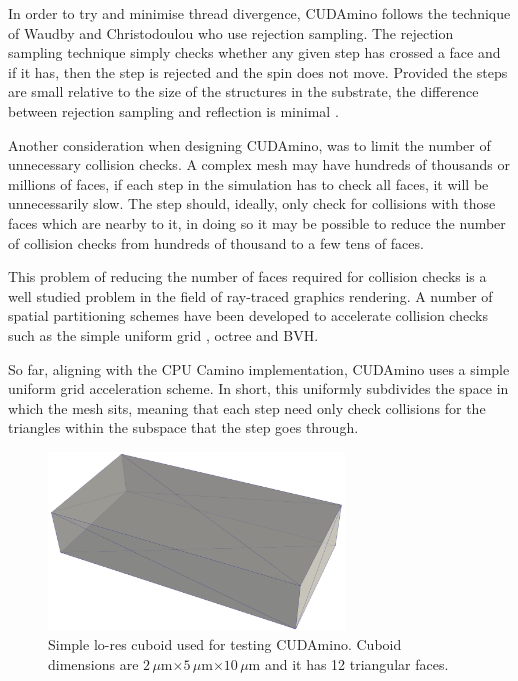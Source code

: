 In order to try and minimise thread divergence, CUDAmino follows the technique of Waudby and Christodoulou \cite{Waudby2011} who use rejection sampling.
The rejection sampling technique simply checks whether any given step has crossed a face and if it has, then the step is rejected and the spin does not move.
Provided the steps are small relative to the size of the structures in the substrate, the difference between rejection sampling and reflection is minimal \cite{Johannesson1996}.

Another consideration when designing CUDAmino, was to limit the number of unnecessary collision checks.
A complex mesh may have hundreds of thousands or millions of faces, if each step in the simulation has to check all faces, it will be unnecessarily slow.
The step should, ideally, only check for collisions with those faces which are nearby to it, in doing so it may be possible to reduce the number of collision checks from hundreds of thousand to a few tens of faces.

This problem of reducing the number of faces required for collision checks is a well studied problem in the field of ray-traced graphics rendering.
A number of spatial partitioning schemes have been developed to accelerate collision checks  such as the simple uniform grid \cite{Fujimoto1986,Amanatides1987}, octree \cite{Fujimoto1986} and \ac{BVH}\cite{Kay1986}. 

So far, aligning with the \ac{CPU} Camino implementation, CUDAmino uses a simple uniform grid acceleration scheme. In short, this uniformly subdivides the space in which the mesh sits, meaning that each step need only check collisions for the triangles within the subspace that the step goes through.

\begin{figure}[t]
  \centering
  \includegraphics[width=0.7\textwidth]{figures/cudamino/cuboid_lores.png}
  \caption{Simple lo-res cuboid used for testing CUDAmino. Cuboid dimensions are $2\,\mu$m$\times5\,\mu$m$\times10\,\mu$m and it has 12 triangular faces.}
  \label{fig:cudamino_cuboid}
\end{figure}

